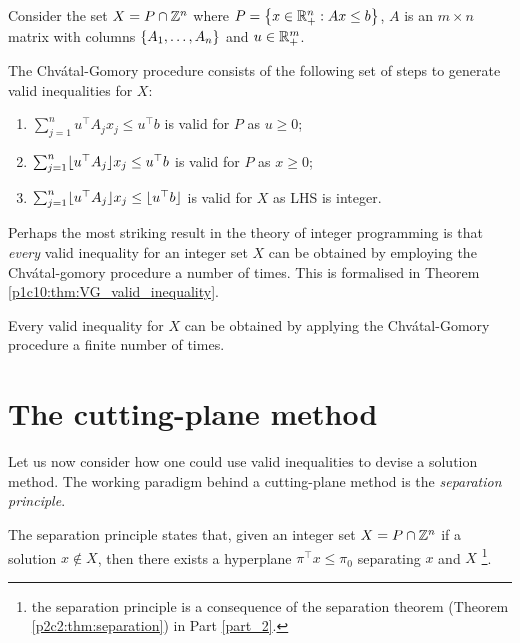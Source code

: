 \begin{definition} \label{p1c10:def:CG-procedure}
	Consider the set $X = P \cap \mathbb{Z}^n$ where $P = \left\{ x \in \mathbb{R}^n_+ : Ax \leq b \right \}$, $A$ is an $m \times n$ matrix with columns $\left\{ A_1, \dots, A_n \right \}$ and $u \in \mathbb{R}^m_+$.
	
	The Chv\'atal-Gomory procedure consists of the following set of steps to generate valid inequalities for $X$:
	\begin{enumerate}
	    \item $\sum_{j=1}^n u^\top A_jx_j \leq u^\top b$ is valid for $P$ as $u\geq 0$;
	    \item $\sum_{j=1}^n \lfloor u^\top A_j \rfloor x_j \leq u^\top b$ is valid for $P$ as $x \geq 0$;
	    \item $\sum_{j=1}^n  \lfloor u^\top A_j \rfloor x_j \leq \lfloor u^\top b \rfloor$ is valid for $X$ as LHS is integer.
	\end{enumerate}		
\end{definition}
	
Perhaps the most striking result in the theory of integer programming is that \emph{every} valid inequality for an integer set $X$ can be obtained by employing the Chv\'atal-gomory procedure a number of times. This is formalised in Theorem \ref{p1c10:thm:VG_valid_inequality}.

\begin{theorem} \label{p1c10:thm:VG_valid_inequality}
	Every valid inequality for $X$ can be obtained by applying the Chv\'atal-Gomory procedure a finite number of times.
\end{theorem}
	
	
	
\section{The cutting-plane method}

Let us now consider how one could use valid inequalities to devise a solution method. The working paradigm behind a cutting-plane method is the \emph{separation principle}. 

The separation principle states that, given an integer set $X = P \cap \mathbb{Z}^n$ if a solution $x \notin X$, then there exists a hyperplane $\pi^\top x \leq \pi_0$ separating $x$ and $X$ \footnote{the separation principle is a consequence of the separation theorem (Theorem \ref{p2c2:thm:separation}) in Part \ref{part_2}.}. 	


